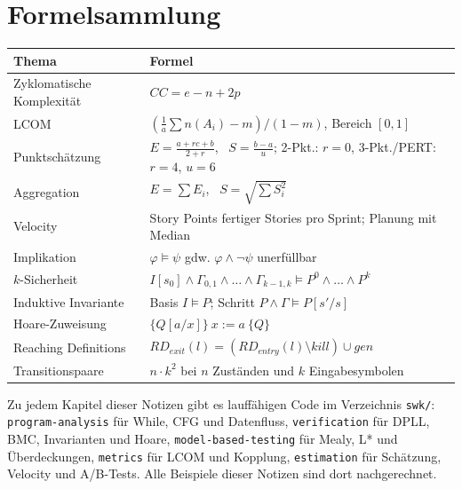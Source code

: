 \documentclass[12pt, a4paper]{article}
\begin{document}
\section{Formelsammlung}

\begin{center}
\begin{tabular}{lp{9.6cm}}
\hline
\textbf{Thema} & \textbf{Formel} \\
\hline
Zyklomatische Komplexität & $CC = e - n + 2p$ \\
LCOM & $\left(\frac{1}{a}\sum n(A_i) - m\right) / (1-m)$, Bereich $[0,1]$ \\
Punktschätzung & $E = \frac{a + r c + b}{2+r}$, \ $S = \frac{b-a}{u}$;
                 2-Pkt.: $r=0$, 3-Pkt./PERT: $r=4$, $u=6$ \\
Aggregation & $E = \sum E_i$, \ $S = \sqrt{\sum S_i^2}$ \\
Velocity & Story Points fertiger Stories pro Sprint; Planung mit Median \\
Implikation & $\varphi \models \psi$ gdw. $\varphi \wedge \neg\psi$ unerfüllbar \\
$k$-Sicherheit & $I[s_0] \wedge \Gamma_{0,1} \wedge \dots \wedge \Gamma_{k-1,k}
                  \models P^0 \wedge \dots \wedge P^k$ \\
Induktive Invariante & Basis $I \models P$; Schritt $P \wedge \Gamma \models P[s'/s]$ \\
Hoare-Zuweisung & $\{Q[a/x]\}\ x := a\ \{Q\}$ \\
Reaching Definitions & $RD_{exit}(l) = (RD_{entry}(l) \setminus kill) \cup gen$ \\
Transitionspaare & $n \cdot k^2$ bei $n$ Zuständen und $k$ Eingabesymbolen \\
\hline
\end{tabular}
\end{center}

\vspace{1em}
\begin{notebox}
Zu jedem Kapitel dieser Notizen gibt es lauffähigen Code im Verzeichnis
\texttt{swk/}: \texttt{program-analysis} für While, CFG und Datenfluss,
\texttt{verification} für DPLL, BMC, Invarianten und Hoare,
\texttt{model-based-testing} für Mealy, L* und Überdeckungen,
\texttt{metrics} für LCOM und Kopplung, \texttt{estimation} für Schätzung, Velocity
und A/B-Tests. Alle Beispiele dieser Notizen sind dort nachgerechnet.
\end{notebox}
\end{document}

